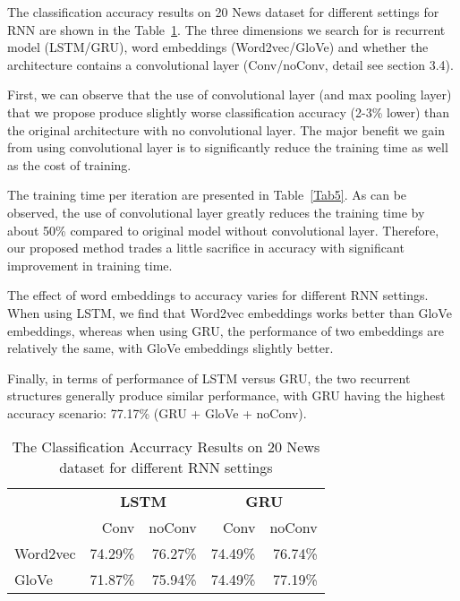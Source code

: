 \documentclass{article}
\begin{document}
The classification accuracy results on 20 News dataset for different settings for RNN are shown in the Table~\ref{Tab4}.
The three dimensions we search for is recurrent model (LSTM/GRU), word embeddings (Word2vec/GloVe) and whether the architecture contains a convolutional layer (Conv/noConv, detail see section 3.4). 

First, we can observe that the use of convolutional layer (and max pooling layer) that we propose produce slightly worse classification accuracy (2-3\% lower) than the original architecture with no convolutional layer. The major benefit we gain from using convolutional layer is to significantly reduce the training time as well as the cost of training. 

The training time per iteration are presented in Table~\ref{Tab5}. As can be observed, the use of convolutional layer greatly reduces the training time by about 50\% compared to original model without convolutional layer. Therefore, our proposed method trades a little sacrifice in accuracy with significant improvement in training time.

The effect of word embeddings to accuracy varies for different RNN settings. When using LSTM, we find that Word2vec embeddings works better than GloVe embeddings, whereas when using GRU, the performance of  two embeddings are relatively the same, with GloVe embeddings slightly better.

Finally, in terms of performance of  LSTM versus GRU, the two recurrent structures generally produce similar performance, with GRU having the highest accuracy scenario: 77.17\% (GRU + GloVe + noConv).
 


\begin{table}
    \begin{tabular}{lrrrr}\toprule
        &\multicolumn{2}{c}{\textbf{LSTM}}&\multicolumn{2}{c}{\textbf{GRU}}
        \\\cmidrule(r){2-3}\cmidrule(r){4-5}
        &Conv&noConv&Conv&noConv\\\midrule
        Word2vec    & 74.29\% & 76.27\% & 74.49\% & 76.74\%\\
        GloVe   & 71.87\% & 75.94\% & 74.49\% & 77.19\%\\\bottomrule
    \end{tabular}
    \caption{\small The Classification Accurracy Results on 20 News dataset for different RNN settings}\label{Tab4}
\end{table}
\end{document}
